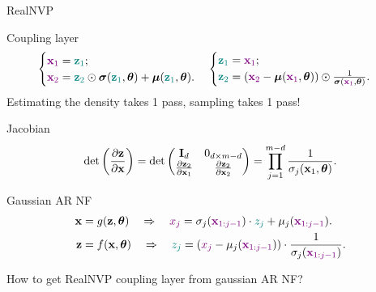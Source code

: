 \begin{frame}{RealNVP}
	\begin{block}{Coupling layer}
		\vspace{-0.7cm}
		\[
		 \begin{cases} {\color{violet}\mathbf{x}_1} = {\color{teal}\mathbf{z}_1}; \\ {\color{violet}\mathbf{x}_2} = {\color{teal}\mathbf{z}_2} \odot \boldsymbol{\sigma}({\color{teal}\mathbf{z}_1}, \boldsymbol{\theta}) + \boldsymbol{\mu}({\color{teal}\mathbf{z}_1}, \boldsymbol{\theta}).\end{cases}  
		\begin{cases} {\color{teal}\mathbf{z}_1} ={\color{violet} \mathbf{x}_1}; \\ {\color{teal}\mathbf{z}_2} = \left({\color{violet}\mathbf{x}_2} - \boldsymbol{\mu}({\color{violet}\mathbf{x}_1}, \boldsymbol{\theta}) \right) \odot \frac{1}{\boldsymbol{\sigma}({\color{violet}\mathbf{x}_1}, \boldsymbol{\theta})}.\end{cases}
		\]
		Estimating the density takes 1 pass, sampling takes 1 pass!
	\end{block}
	\begin{block}{Jacobian}
		\vspace{-0.5cm}
		\[
		\det \left( \frac{\partial \mathbf{z}}{\partial \mathbf{x}} \right) = \det 
		\begin{pmatrix}
			\mathbf{I}_d & 0_{d \times m - d} \\
			\frac{\partial \mathbf{z}_2}{\partial \mathbf{x}_1} & \frac{\partial \mathbf{z}_2}{\partial \mathbf{x}_2}
		\end{pmatrix} = \prod_{j=1}^{m - d} \frac{1}{\sigma_j(\mathbf{x}_1, \boldsymbol{\theta})}.
		\]
		\vspace{-0.5cm}
	\end{block}
	\begin{block}{Gaussian AR NF}
		\vspace{-0.6cm}
		\begin{align*}
			\mathbf{x} &= g(\mathbf{z}, \boldsymbol{\theta}) \quad \Rightarrow \quad {\color{violet}x_j} = \sigma_j ({\color{violet}\mathbf{x}_{1:j-1}}) \cdot {\color{teal} z_j} + \mu_j({\color{violet}\mathbf{x}_{1:j-1}}). \\
			\mathbf{z} &= f(\mathbf{x}, \boldsymbol{\theta}) \quad \Rightarrow \quad {\color{teal} z_j} = \left({\color{violet} x_j} - \mu_j({\color{violet}\mathbf{x}_{1:j-1}}) \right) \cdot \frac{1}{\sigma_j ({\color{violet} \mathbf{x}_{1:j-1}}) }.
		\end{align*}
		\vspace{-0.5cm}
	\end{block}
	How to get RealNVP coupling layer from gaussian AR NF?
	
\end{frame}

